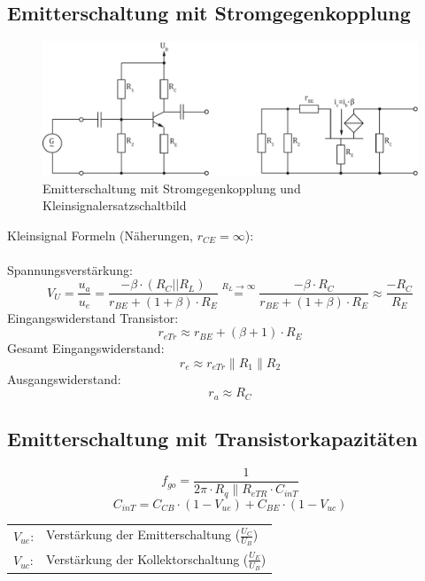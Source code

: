 \subsection{Emitterschaltung mit Stromgegenkopplung}
\begin{figure}[h!]
	\centering
	\includegraphics[width = \linewidth]{trans_emitter_stromgegen.pdf}
	\caption{Emitterschaltung mit Stromgegenkopplung und Kleinsignalersatzschaltbild}
	\label{trans:emitterschaltung_sgk}
\end{figure}
\noindent
Kleinsignal Formeln (Näherungen, $r_{CE} = \infty$):
\\\\
Spannungsverstärkung:
\[
	V_U = \frac{u_a}{u_e} = \frac{-\beta \cdot (R_C || R_L)}{r_{BE} + (1 + \beta) \cdot R_E} \stackrel{R_L \to \infty}{=} \frac{-\beta \cdot R_C}{r_{BE} + (1 + \beta) \cdot R_E} \approx \frac{-R_C}{R_E}
\]
Eingangswiderstand Transistor:
\[
	r_{eTr} \approx r_{BE} + (\beta + 1) \cdot R_E
\]
Gesamt Eingangswiderstand:
\[
	r_e \approx r_{eTr} \parallel R_1 \parallel R_2
\]
Ausgangswiderstand:
\[
	r_a \approx R_C
\]

\subsection{Emitterschaltung mit Transistorkapazitäten}
\[
	f_{go} = \frac{1}{2\pi \cdot R_q \parallel R_{eTR} \cdot C_{inT}}
\]
\[
	C_{inT} = C_{CB} \cdot (1-V_{ue}) + C_{BE} \cdot (1-V_{uc})
\]
\begin{tabular}{@{}ll}
  $V_{ue}$:	    & Verstärkung der Emitterschaltung ($\frac{U_{C}}{U_{B}}$) \\
  $V_{uc}$:	    & Verstärkung der Kollektorschaltung ($\frac{U_{E}}{U_{B}}$) \\
\end{tabular}

